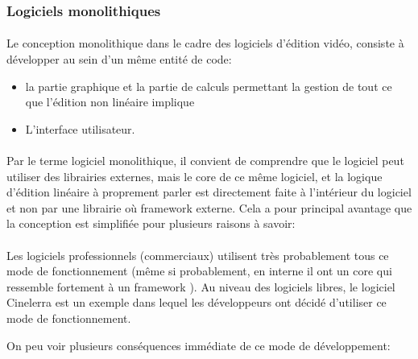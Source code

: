 \subsubsection{Logiciels monolithiques } %

\paragraph{}

Le conception monolithique  dans le cadre des
logiciels d'édition vidéo, consiste à développer au sein d'un même
entité de code:

\begin{itemize} \setlength{\itemsep}{2mm}

  \item {la partie graphique et la partie de calculs
    permettant la gestion de tout ce que l'édition non linéaire
    implique}

  \item {L'interface utilisateur.}

\end {itemize}

\paragraph{}

Par le terme logiciel monolithique, il convient
de comprendre que le logiciel peut utiliser des librairies externes,
mais le core de ce même logiciel, et la logique d'édition linéaire
à proprement parler est directement faite à l'intérieur du logiciel
et non par une librairie où framework  externe. Cela a
pour principal avantage que la conception est simplifiée pour plusieurs
raisons à savoir:

\paragraph{}

Les logiciels professionnels (commerciaux) utilisent très probablement
tous ce mode de fonctionnement (même si probablement, en interne il ont
un core qui ressemble fortement à un framework ). Au
niveau des logiciels libres, le logiciel Cinelerra est un exemple
dans lequel les développeurs ont décidé d'utiliser ce mode de
fonctionnement.

On peu voir plusieurs conséquences immédiate de ce mode de
développement:

